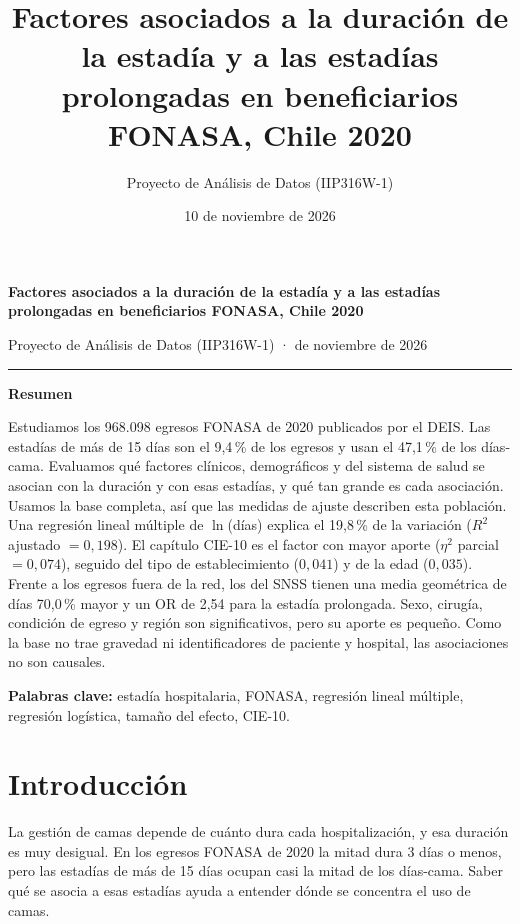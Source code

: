 \documentclass[10.5pt,a4paper,headings=small,abstract=false]{scrartcl}
\title{Factores asociados a la duración de la estadía y a las estadías prolongadas en beneficiarios FONASA, Chile 2020}
\author{Proyecto de Análisis de Datos (IIP316W-1)}
\date{10 de noviembre de 2026}
\newcommand{\cie}{\mbox{CIE-10}}
\newcommand{\pct}{\,\%}
\begin{document}
{\raggedright
{\sffamily\bfseries\color{acento}\fontsize{21}{25}\selectfont Factores asociados a la duración de la estadía y a las estadías prolongadas en beneficiarios FONASA, Chile 2020\par}
\vspace{0.9em}
{\color{gris}\small Proyecto de Análisis de Datos (IIP316W-1) \quad· de noviembre de 2026\par}
\vspace{0.4em}
{\color{filete}\rule{\textwidth}{0.6pt}}\par}
\vspace{0.4em}

{\sffamily\bfseries\color{acento}\large Resumen}\par\vspace{-0.2em}
Estudiamos los 968.098 egresos FONASA de 2020 publicados por el DEIS. Las estadías de más de 15 días son el 9,4\pct{} de los egresos y usan el 47,1\pct{} de los días-cama. Evaluamos qué factores clínicos, demográficos y del sistema de salud se asocian con la duración y con esas estadías, y qué tan grande es cada asociación. Usamos la base completa, así que las medidas de ajuste describen esta población. Una regresión lineal múltiple de $\ln$(días) explica el 19,8\pct{} de la variación ($R^2$ ajustado $=0{,}198$). El capítulo \cie{} es el factor con mayor aporte ($\eta^2$ parcial $=0{,}074$), seguido del tipo de establecimiento ($0{,}041$) y de la edad ($0{,}035$). Frente a los egresos fuera de la red, los del SNSS tienen una media geométrica de días 70,0\pct{} mayor y un OR de 2,54 para la estadía prolongada. Sexo, cirugía, condición de egreso y región son significativos, pero su aporte es pequeño. Como la base no trae gravedad ni identificadores de paciente y hospital, las asociaciones no son causales.

{\small\color{gris}\textbf{Palabras clave:} estadía hospitalaria, FONASA, regresión lineal múltiple, regresión logística, tamaño del efecto, \cie.\par}

\section{Introducción}

La gestión de camas depende de cuánto dura cada hospitalización, y esa duración es muy desigual. En los egresos FONASA de 2020 la mitad dura 3 días o menos, pero las estadías de más de 15 días ocupan casi la mitad de los días-cama. Saber qué se asocia a esas estadías ayuda a entender dónde se concentra el uso de camas.
\end{document}
